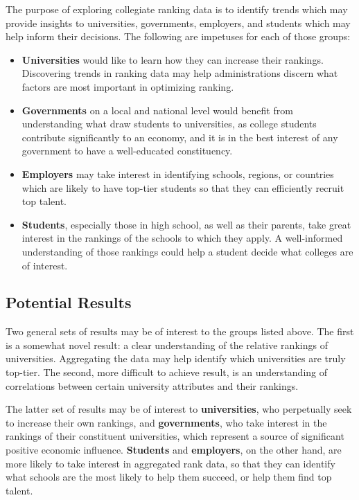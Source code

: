 \documentclass[12pt]{article}
\begin{document}
The purpose of exploring collegiate ranking data is to identify trends which may provide insights to universities, governments, employers, and students which may help inform their decisions. The following are impetuses for each of those groups:
\begin{itemize}
\item \textbf{Universities} would like to learn how they can increase their rankings. Discovering trends in ranking data may help administrations discern what factors are most important in optimizing ranking.
\item \textbf{Governments} on a local and national level would benefit from understanding what draw students to universities, as college students contribute significantly to an economy, and it is in the best interest of any government to have a well-educated constituency.
\item \textbf{Employers} may take interest in identifying schools, regions, or countries which are likely to have top-tier students so that they can efficiently recruit top talent.
\item \textbf{Students}, especially those in high school, as well as their parents, take great interest in the rankings of the schools to which they apply. A well-informed understanding of those rankings could help a student decide what colleges are of interest.
\end{itemize}

\subsection{Potential Results}

Two general sets of results may be of interest to the groups listed above. The first is a somewhat novel result: a clear understanding of the relative rankings of universities. Aggregating the data may help identify which universities are truly top-tier. The second, more difficult to achieve result, is an understanding of correlations between certain university attributes and their rankings. 

The latter set of results may be of interest to \textbf{universities}, who perpetually seek to increase their own rankings, and \textbf{governments}, who take interest in the rankings of their constituent universities, which represent a source of significant positive economic influence. \textbf{Students} and \textbf{employers}, on the other hand, are more likely to take interest in aggregated rank data, so that they can identify what schools are the most likely to help them succeed, or help them find top talent.
\end{document}
